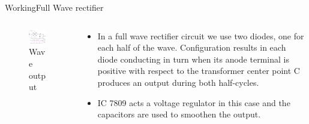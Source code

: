 \documentclass{beamer}
\begin{document}
\begin{frame}{Working}{Full Wave rectifier}
  \begin{columns}
  \begin{column}{0.32\textwidth}
    \begin{center}
\begin{figure}[htb]
\centering
\caption{\small Wave output}
\includegraphics[width=\columnwidth]{5.jpg}
\end{figure}
\end{center}    
    \end{column}
    \begin{column}{0.55\textwidth}

\begin{itemize}
  \item
  In a full wave rectifier circuit we use two diodes, one for each half of the wave. Configuration results in each diode conducting in turn when its anode terminal is positive with respect to the transformer center point C produces an output during both half-cycles.
  \item
  IC 7809 acts a voltage regulator in this case and the capacitors are used to smoothen the output.
  
  \end{itemize}
  
    \end{column}
    
\end{columns}
\end{frame}

\end{document}
